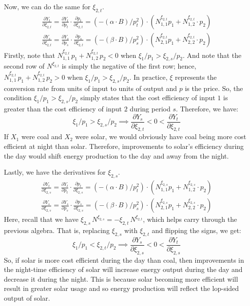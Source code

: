 \documentclass[12pt,a4paper]{extarticle}
\begin{document}
Now, we can do the same for $\xi_{2,t}$. 
\begin{align*}
\frac{\partial Y_t}{\partial \xi_{2,t}} = \frac{\partial Y_t}{\partial p_t}  \cdot \frac{\partial p_t}{\partial \xi_{2,t}} = (-(\alpha \cdot B)/p_t^2) \cdot (N^{\xi_{2,t}}_{1,1} p_1 + N^{\xi_{2,t}}_{1,2} \cdot p_2) \\
\frac{\partial Y_s}{\partial \xi_{2,t}} = \frac{\partial Y_s}{\partial p_s}  \cdot \frac{\partial p_s}{\partial \xi_{2,t}} = (-(\beta \cdot B)/p_s^2) \cdot (N^{\xi_{2,t}}_{2,1} p_1 + N^{\xi_{2,t}}_{2,2} \cdot p_2) 
\end{align*}
Firstly, note that $N^{\xi_{2,t}}_{1,1} \, p_1 + N^{\xi_{2,t}}_{1,2} \, p_2 < 0$ when $\xi_1 / p_1 > \xi_{2,s} / p_2$. And note that the second row of $N^{\xi_{2,t}}$ is simply the negative of the first row; hence, $N^{\xi_{2,t}}_{1,1} \, p_1 + N^{\xi_{2,t}}_{1,2} \, p_2 > 0$ when $\xi_1 / p_1 > \xi_{2,s} / p_2$. In practice, $\xi$ represents the conversion rate from units of input to units of output and $p$ is the price. So, the condition $\xi_1 / p_1 > \xi_{2,s} / p_2$ simply states that the cost efficiency of input $1$ is greater than the cost efficiency of input $2$ during period $s$. Therefore, we have:
$$\xi_1 / p_1 > \xi_{2,s} / p_2 \implies 
\frac{\partial Y_s}{\partial \xi_{2,t}} < 0 < \frac{\partial Y_t}{\partial \xi_{2,t}} $$
If $X_1$ were coal and $X_2$ were solar, we would obviously have coal being more cost efficient at night than solar. Therefore, improvements to solar's efficiency during the day would shift energy production to the day and away from the night. 

Lastly, we have the derivatives for $\xi_{2,s}$. 
\begin{align*}
\frac{\partial Y_t}{\partial \xi_{2,s}} = \frac{\partial Y_t}{\partial p_t}  \cdot \frac{\partial p_t}{\partial \xi_{2,s}} = (-(\alpha \cdot B)/p_t^2) \cdot (N^{\xi_{2,s}}_{1,1} p_1 + N^{\xi_{2,s}}_{1,2} \cdot p_2) \\
\frac{\partial Y_s}{\partial \xi_{2,s}} = \frac{\partial Y_s}{\partial p_s}  \cdot \frac{\partial p_s}{\partial \xi_{2,s}} = (-(\beta \cdot B)/p_s^2) \cdot (N^{\xi_{2,s}}_{2,1} p_1 + N^{\xi_{2,s}}_{2,2} \cdot p_2) 
\end{align*}
Here, recall that we have  $\xi_{2,s} \, N^{\xi_{2,s}} = - \xi_{2,t} \, N^{\xi_{2,t}}$, which helps carry through the previous algebra. That is, replacing $\xi_{2,s}$ with $\xi_{2,t}$ and flipping the signs, we get:
$$\xi_1 / p_1 < \xi_{2,t} / p_2 \implies 
\frac{\partial Y_s}{\partial \xi_{2,s}} < 0 < \frac{\partial Y_t}{\partial \xi_{2,s}} $$
So, if solar is more cost efficient during the day than coal, then improvements in the night-time efficiency of solar will increase energy output during the day and decrease it during the night. This is because solar becoming more efficient will result in greater solar usage and so energy production will reflect the lop-sided output of solar. 
\end{document}
